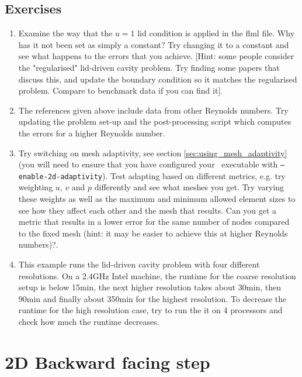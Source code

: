 \subsection{Exercises}
\begin{enumerate}
\item Examine the way that the $u=1$ lid condition is applied in the flml file. Why has it not been set as simply a constant?
Try changing it to a constant and see what happens to the errors that you achieve. [Hint: some people consider the "regularised" 
lid-driven cavity problem. Try finding some papers that discuss this, and update the boundary condition so it matches the 
regularised problem. Compare to benchmark data if you can find it].
\item The references given above include data from other Reynolds numbers. Try updating the problem set-up and the post-processing script which computes
the errors for a higher Reynolds number.
\item Try switching on mesh adaptivity, see section \ref{sec:using_mesh_adaptivity} (you will need to ensure that you have configured your \fluidity\ executable with \texttt{--enable-2d-adaptivity}). 
Test adapting based on different metrics, e.g. try weighting $u$, $v$ and $p$
differently and see what meshes you get. Try varying these weights as well as the maximum and minimum allowed element
sizes to see how they affect each other and the mesh that results. Can you get a metric that results in a lower
error for the same number of nodes compared to the fixed mesh (hint: it may be easier to achieve this at higher Reynolds numbers)?.
\item This example runs the lid-driven cavity problem with four different resolutions. On a 2.4GHz Intel machine, the runtime for the coarse resolution setup is below 15min, the next higher resolution takes about 30min, then 90min and finally about 350min for the highest resolution. To decrease the runtime for the high resolution case, try to run the it on 4 processors and check how much the runtime decreases.
\end{enumerate}



\section{2D Backward facing step}
\label{sec:backward_facing_step_2d}


